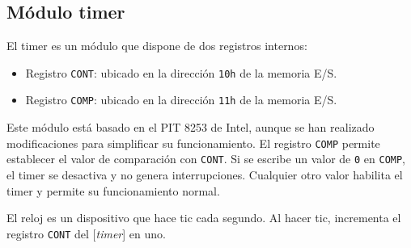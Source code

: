 \documentclass[12pt,oneside]{templates/unerthesis}
\providecommand{\tightlist}{%
  \setlength{\itemsep}{0pt}\setlength{\parskip}{0pt}}
\begin{document}
\hypertarget{muxf3dulo-timer}{%
\subsection{Módulo timer}\label{muxf3dulo-timer}}

El timer es un módulo que dispone de dos registros internos:

\begin{itemize}
\tightlist
\item
  Registro \texttt{CONT}: ubicado en la dirección \texttt{10h} de la memoria E/S.
\item
  Registro \texttt{COMP}: ubicado en la dirección \texttt{11h} de la memoria E/S.
\end{itemize}

Este módulo está basado en el PIT 8253 de Intel, aunque se han realizado modificaciones para simplificar su funcionamiento. El registro \texttt{COMP} permite establecer el valor de comparación con \texttt{CONT}. Si se escribe un valor de \texttt{0} en \texttt{COMP}, el timer se desactiva y no genera interrupciones. Cualquier otro valor habilita el timer y permite su funcionamiento normal.

El reloj es un dispositivo que hace tic cada segundo. Al hacer tic, incrementa el registro \texttt{CONT} del {[}\emph{timer}{]} en uno.
\end{document}

